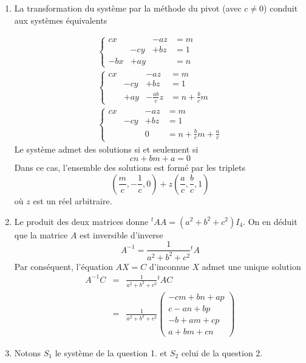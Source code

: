 \begin{enumerate}
  \item La transformation du syst{\`e}me par la m{\'e}thode du pivot (avec
  $c\neq 0$)
  conduit aux syst{\`e}mes {\'e}quivalents

  \begin{eqnarray*}
  \left \{
\begin{array}{cccc}
  cx& & -az&=m\\
   &-cy&+bz &=1\\
  -bx&+ay& &=n
\end{array}
  \right. \\
\left \{
\begin{array}{cccc}
  cx& & -az&=m\\
   &-cy&+bz &=1\\
  &+ay&-\frac{ab}{c}z &=n+\frac{b}{c}m
\end{array}
  \right. \\
\left \{
\begin{array}{cccc}
  cx& & -az&=m\\
   &-cy&+bz &=1\\
  && 0&=n+\frac{b}{c}m+\frac{a}{c}
\end{array}
  \right.
  \end{eqnarray*}
Le syst{\`e}me admet des solutions si et seulement si
\[cn+bm+a=0\]
Dans ce cas, l'ensemble des solutions est form{\'e} par les triplets
\[(\frac{m}{c},-\frac{1}{c},0)+z(\frac{a}{c},\frac{b}{c},1)\]
o{\`u} $z$ est un r{\'e}el arbitraire.
  \item Le produit des deux matrices donne
  $\phantom{}^tAA=(a^2+b^2+c^2)I_4$. On en d{\'e}duit que la matrice
  $A$ est inversible d'inverse
  \[A^{-1}=\frac{1}{a^2+b^2+c^2}\phantom{}^tA\]
  Par cons{\'e}quent, l'{\'e}quation $AX=C$ d'inconnue $X$ admet une
  unique solution
  \begin{eqnarray*}
  A^{-1}C&=&\frac{1}{a^2+b^2+c^2}\phantom{}^tA C\\
  &=&\frac{1}{a^2+b^2+c^2}
       \left(
        \begin{array}{c}
          -cm+bn+ap\\
          c-an+bp\\
          -b+am+cp\\
          a+bm+cn
        \end{array}
       \right)
  \end{eqnarray*}
  \item Notons $S_1$ le syst{\`e}me de la question 1. et $S_2$ celui de la question 2.\newline

\end{enumerate}
